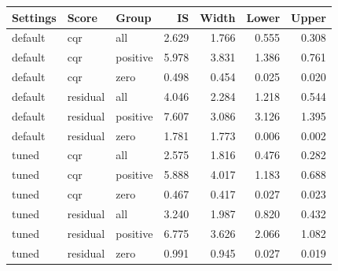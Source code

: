 \begin{tabular}{lllrrrr}
\toprule
Settings & Score & Group & IS & Width & Lower & Upper \\
\midrule
default & cqr & all & 2.629 & 1.766 & 0.555 & 0.308 \\
default & cqr & positive & 5.978 & 3.831 & 1.386 & 0.761 \\
default & cqr & zero & 0.498 & 0.454 & 0.025 & 0.020 \\
default & residual & all & 4.046 & 2.284 & 1.218 & 0.544 \\
default & residual & positive & 7.607 & 3.086 & 3.126 & 1.395 \\
default & residual & zero & 1.781 & 1.773 & 0.006 & 0.002 \\
tuned & cqr & all & 2.575 & 1.816 & 0.476 & 0.282 \\
tuned & cqr & positive & 5.888 & 4.017 & 1.183 & 0.688 \\
tuned & cqr & zero & 0.467 & 0.417 & 0.027 & 0.023 \\
tuned & residual & all & 3.240 & 1.987 & 0.820 & 0.432 \\
tuned & residual & positive & 6.775 & 3.626 & 2.066 & 1.082 \\
tuned & residual & zero & 0.991 & 0.945 & 0.027 & 0.019 \\
\bottomrule
\end{tabular}
